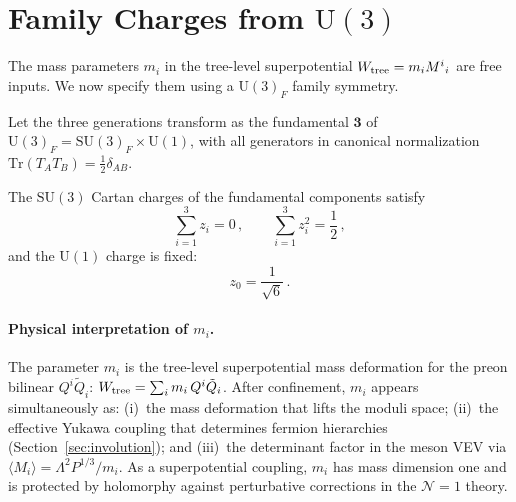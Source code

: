 \documentclass[12pt,a4paper]{article}
\newcommand{\SU}{\mathrm{SU}}
\newcommand{\UU}{\mathrm{U}}
\newcommand{\Tr}{\mathrm{Tr}}
\begin{document}
\section{Family Charges from $\UU(3)$}
\label{sec:u3}

The mass parameters $m_i$ in the tree-level superpotential
$W_{\rm tree} = m_i M^i{}_i$ are free inputs. We now specify them
using a $\UU(3)_F$ family symmetry.

Let the three generations transform as the fundamental
$\mathbf{3}$ of $\UU(3)_F = \SU(3)_F \times \UU(1)$, with all
generators in canonical normalization $\Tr(T_A T_B) =
\frac{1}{2}\delta_{AB}$.

The $\SU(3)$ Cartan charges of the fundamental components satisfy
\begin{equation}
  \sum_{i=1}^3 z_i = 0\,,
  \qquad
  \sum_{i=1}^3 z_i^2 = \frac{1}{2}\,,
  \label{eq:su3constraints}
\end{equation}
and the $\UU(1)$ charge is fixed:
\begin{equation}
  z_0 = \frac{1}{\sqrt{6}}\,.
  \label{eq:z0}
\end{equation}

\paragraph{Physical interpretation of $m_i$.}
The parameter $m_i$ is the tree-level superpotential mass deformation
for the preon bilinear $Q^i\tilde Q_i$:
$W_{\rm tree} = \sum_i m_i\,Q^i\tilde Q_i$.
After confinement, $m_i$ appears simultaneously as: (i)~the mass
deformation that lifts the moduli space; (ii)~the effective Yukawa
coupling that determines fermion hierarchies (Section~\ref{sec:involution});
and (iii)~the determinant factor in the meson VEV via
$\langle M_i\rangle = \Lambda^2 P^{1/3}/m_i$.
As a superpotential coupling, $m_i$ has mass dimension one and is
protected by holomorphy against perturbative corrections
in the $\mathcal{N}=1$ theory.
\end{document}
